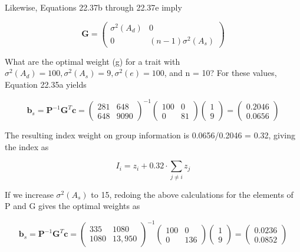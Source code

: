 \documentclass{article}
\begin{document}
Likewise, Equations 22.37b through 22.37e imply

\begin{equation}
\mathbf{G}=\begin{pmatrix}{{{\sigma^{2}(A_{d})}}}&{{{0}}} \\{{{0}}}&{{{(n-1)\sigma^{2}(A_{s})}}}\end{pmatrix}
\end{equation}

What are the optimal weight (g) for a trait with  $ \sigma^{2}(A_{d}) = 100, \sigma^{2}(A_{s}) = 9, \sigma^{2}(e) = 100 $, and n = 10? For these values, Equation 22.35a yields

\begin{equation}
\mathbf{b}_{s}=\mathbf{P}^{-1}\mathbf{G}^{T}\mathbf{c}=\begin{pmatrix}{{{281}}}&{{{648}}} \\{{{648}}}&{{{9090}}}\end{pmatrix}^{-1}\begin{pmatrix}{{{100}}}&{{{0}}} \\{{{0}}}&{{{81}}}\end{pmatrix}\begin{pmatrix}{{{1}}} \\{{{9}}}\end{pmatrix}=\begin{pmatrix}{{{0.2046}}} \\{{{0.0656}}}\end{pmatrix}
\end{equation}

The resulting index weight on group information is 0.0656/0.2046 = 0.32, giving the index as

\begin{equation}
I_{i}=z_{i}+0.32\cdot\sum_{j\neq i}z_{j}
\end{equation}

If we increase  $ \sigma^{2}(A_{s}) $ to 15, redoing the above calculations for the elements of P and G gives the optimal weights as

\begin{equation}
\mathbf{b}_{s}=\mathbf{P}^{-1}\mathbf{G}^{T}\mathbf{c}=\begin{pmatrix}{{{335}}}&{{{1080}}} \\{{{1080}}}&{{{13,950}}}\end{pmatrix}^{-1}\begin{pmatrix}{{{100}}}&{{{0}}} \\{{{0}}}&{{{136}}}\end{pmatrix}\begin{pmatrix}{{{1}}} \\{{{9}}}\end{pmatrix}=\begin{pmatrix}{{{0.0236}}} \\{{{0.0852}}}\end{pmatrix}
\end{equation}
\end{document}
